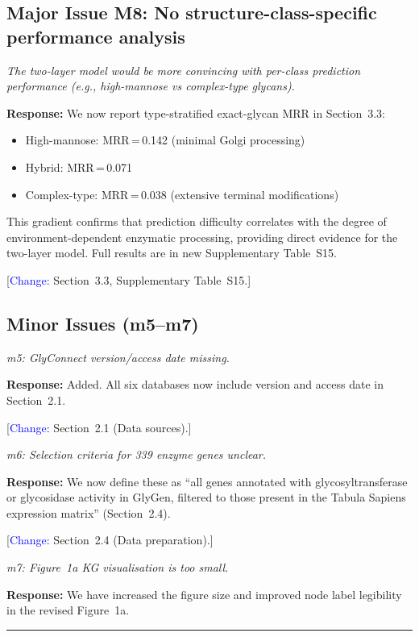 \documentclass[11pt,a4paper]{article}
\newcommand{\reviewercomment}[1]{\textit{\color{black!70}#1}}
\newcommand{\response}[1]{\textbf{Response:} #1}
\newcommand{\change}[1]{[\textcolor{blue}{Change:} #1]}
\begin{document}
\subsection*{Major Issue M8: No structure-class-specific performance analysis}

\reviewercomment{The two-layer model would be more convincing with per-class
prediction performance (e.g., high-mannose vs complex-type glycans).}

\response{We now report type-stratified exact-glycan MRR in Section~3.3:
\begin{itemize}[nosep]
  \item High-mannose: MRR\,=\,0.142 (minimal Golgi processing)
  \item Hybrid: MRR\,=\,0.071
  \item Complex-type: MRR\,=\,0.038 (extensive terminal modifications)
\end{itemize}
This gradient confirms that prediction difficulty correlates with the degree of
environment-dependent enzymatic processing, providing direct evidence for the
two-layer model. Full results are in new Supplementary Table~S15.}

\change{Section~3.3, Supplementary Table~S15.}

\subsection*{Minor Issues (m5--m7)}

\reviewercomment{m5: GlyConnect version/access date missing.}

\response{Added. All six databases now include version and access date in
Section~2.1.}

\change{Section~2.1 (Data sources).}

\reviewercomment{m6: Selection criteria for 339 enzyme genes unclear.}

\response{We now define these as ``all genes annotated with glycosyltransferase
or glycosidase activity in GlyGen, filtered to those present in the Tabula
Sapiens expression matrix'' (Section~2.4).}

\change{Section~2.4 (Data preparation).}

\reviewercomment{m7: Figure~1a KG visualisation is too small.}

\response{We have increased the figure size and improved node label legibility
in the revised Figure~1a.}

\vspace{1em}
\noindent\rule{\linewidth}{0.8pt}
\end{document}

